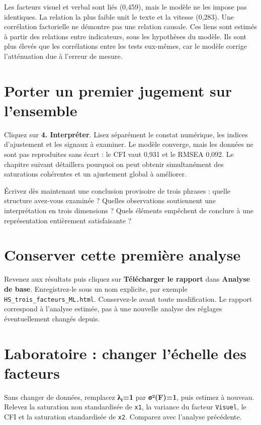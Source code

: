 \documentclass[
  french,
  11pt,
  a4paper,
  DIV=11,
  numbers=noendperiod]{scrreprt}
\begin{document}
Les facteurs visuel et verbal sont liés (0,459), mais le modèle ne les
impose pas identiques. La relation la plus faible unit le texte et la
vitesse (0,283). Une corrélation factorielle ne démontre pas une
relation causale. Ces liens sont estimés à partir des relations entre
indicateurs, sous les hypothèses du modèle. Ils sont plus élevés que les
corrélations entre les tests eux-mêmes, car le modèle corrige
l'atténuation due à l'erreur de mesure.

\section{Porter un premier jugement sur
l'ensemble}\label{porter-un-premier-jugement-sur-lensemble}

Cliquez sur \textbf{4. Interpréter}. Lisez séparément le constat
numérique, les indices d'ajustement et les signaux à examiner. Le modèle
converge, mais les données ne sont pas reproduites sans écart : le CFI
vaut 0,931 et le RMSEA 0,092. Le chapitre suivant détaillera pourquoi on
peut obtenir simultanément des saturations cohérentes et un ajustement
global à améliorer.

Écrivez dès maintenant une conclusion provisoire de trois phrases :
quelle structure avez-vous examinée ? Quelles observations soutiennent
une interprétation en trois dimensions ? Quels éléments empêchent de
conclure à une représentation entièrement satisfaisante ?

\section{Conserver cette première
analyse}\label{conserver-cette-premiuxe8re-analyse}

Revenez aux résultats puis cliquez sur \textbf{Télécharger le rapport}
dans \textbf{Analyse de base}. Enregistrez-le sous un nom explicite, par
exemple \texttt{HS\_trois\_facteurs\_ML.html}. Conservez-le avant toute
modification. Le rapport correspond à l'analyse estimée, pas à une
nouvelle analyse des réglages éventuellement changés depuis.

\section{Laboratoire : changer l'échelle des
facteurs}\label{laboratoire-changer-luxe9chelle-des-facteurs}

Sans changer de données, remplacez \textbf{λ₁=1} par \textbf{σ²(F)=1},
puis estimez à nouveau. Relevez la saturation non standardisée de
\texttt{x1}, la variance du facteur \texttt{Visuel}, le CFI et la
saturation standardisée de \texttt{x2}. Comparez avec l'analyse
précédente.
\end{document}
